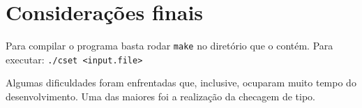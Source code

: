 \documentclass[12pt]{article}
\begin{document}
\section{Considerações finais}

Para compilar o programa basta rodar \texttt{make} no diretório que o contém.
Para executar: \texttt{./cset <input.file>}

Algumas dificuldades foram enfrentadas que, inclusive, ocuparam muito tempo do desenvolvimento. 
Uma das maiores foi a realização da checagem de tipo.


\end{document}
